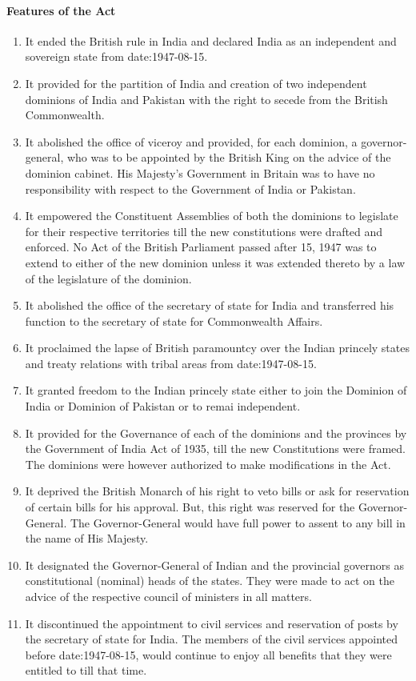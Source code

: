 \begin{multicols}{2}
\paragraph{Features of the Act}
\begin{enumerate}
  \item It ended the British rule in India and declared India as an independent and sovereign state from \gls{date:1947-08-15}.
  \item It provided for the partition of India and creation of two independent dominions of India and Pakistan with the right to secede from the British Commonwealth.
  \item It abolished the office of viceroy and provided, for each dominion, a governor-general, who was to be appointed by the British King on the advice of the dominion cabinet. His Majesty's Government in Britain was to have no responsibility with respect to the Government of India or Pakistan.
  \item It empowered the Constituent Assemblies of both the dominions to legislate for their respective territories till the new constitutions were drafted and enforced. No Act of the British Parliament passed after 15, 1947 was to extend to either of the new dominion unless it was extended thereto by a law of the legislature of the dominion.
  \item It abolished the office of the secretary of state for India and transferred his function to the secretary of state for Commonwealth Affairs.
  \item It proclaimed the lapse of British paramountcy over the Indian princely states and treaty relations with tribal areas from \gls{date:1947-08-15}.
  \item It granted freedom to the Indian princely state either to join the Dominion of India or Dominion of Pakistan or to remai independent.
  \item It provided for the Governance of each of the dominions and the provinces by the Government of India Act of 1935, till the new Constitutions were framed. The dominions were however authorized to make modifications in the Act.
  \item It deprived the British Monarch of his right to veto bills or ask for reservation of certain bills for his approval. But, this right was reserved for the Governor-General. The Governor-General would have full power to assent to any bill in the name of His Majesty.
  \item It designated the Governor-General of Indian and the provincial governors as constitutional (nominal) heads of the states. They were made to act on the advice of the respective council of ministers in all matters.
  \item It discontinued the appointment to civil services and reservation of posts by the secretary of state for India. The members of the civil services appointed before \gls{date:1947-08-15}, would continue to enjoy all benefits that they were entitled to till that time.
\end{enumerate}


\end{multicols}
